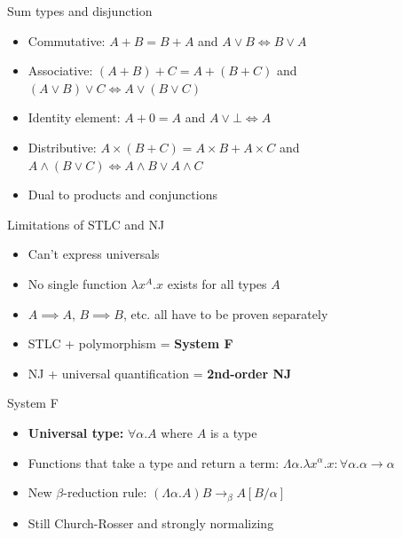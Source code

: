 \documentclass{beamer}
\begin{document}
\begin{frame}{Sum types and disjunction}
    \begin{itemize}
        \item Commutative: $A + B = B + A$ and $A \lor B \iff B \lor A$
        \item Associative: $(A + B) + C = A + (B + C)$ and $(A \lor B) \lor C \iff A \lor (B \lor C)$
        \item Identity element: $A + 0 = A$ and $A \lor \bot \iff A$
        \item Distributive: $A \times (B + C) = A \times B + A \times C$ and $A \land (B \lor C) \iff A \land B \lor A \land C$
        \item Dual to products and conjunctions
    \end{itemize}
\end{frame}

\begin{frame}{Limitations of STLC and NJ}
    \begin{itemize}
        \item Can't express universals
        \item No single function $\lambda x^A.x$ exists for all types $A$
        \item $A \implies A$, $B \implies B$, etc. all have to be proven separately
        \item STLC + polymorphism = \textbf{System F}
        \item NJ + universal quantification = \textbf{2nd-order NJ}
    \end{itemize}
\end{frame}

\begin{frame}{System F}
    \begin{itemize}
        \item \textbf{Universal type:} $\forall \alpha. A$ where $A$ is a type
        \item Functions that take a type and return a term: $\Lambda \alpha. \lambda x^\alpha. x: \forall \alpha. \alpha \to \alpha$
        \item New $\beta$-reduction rule: $(\Lambda \alpha. A) B \to_\beta A[B/\alpha]$
        \item Still Church-Rosser and strongly normalizing
    \end{itemize}
    
    \begin{prooftree}
    \end{prooftree}
    
    \begin{prooftree}
    \end{prooftree}
\end{frame}
\end{document}
